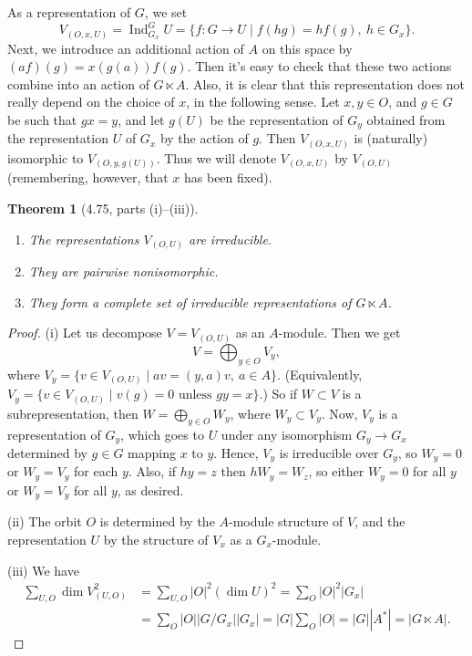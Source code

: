\documentclass[UTF8,11pt]{ctexart}
\newtheorem*{theorem}{Theorem}
\theoremstyle{definition}
\begin{document}
As a representation of $G$, we set
\[
V_{(O,x,U)}=\operatorname{Ind}_{G_x}^G U
=\{f:G\to U\mid f(hg)=hf(g),\ h\in G_x\}.
\]
Next, we introduce an additional action of $A$ on this space by $(af)(g)=x(g(a))f(g)$. Then it's easy to check that these two actions combine into an action of $G\ltimes A$. Also, it is clear that this representation does not really depend on the choice of $x$, in the following sense. Let $x,y\in O$, and $g\in G$ be such that $gx=y$, and let $g(U)$ be the representation of $G_y$ obtained from the representation $U$ of $G_x$ by the action of $g$. Then $V_{(O,x,U)}$ is (naturally) isomorphic to $V_{(O,y,g(U))}$. Thus we will denote $V_{(O,x,U)}$ by $V_{(O,U)}$ (remembering, however, that $x$ has been fixed).
\begin{theorem}[4.75, parts (i)--(iii)]
\begin{enumerate}[label=(\roman*)]
\item The representations $V_{(O,U)}$ are irreducible.
\item They are pairwise nonisomorphic.
\item They form a complete set of irreducible representations of $G\ltimes A$.
\end{enumerate}
\end{theorem}
\begin{proof}
(i) Let us decompose $V=V_{(O,U)}$ as an $A$-module. Then we get
\[
V=\bigoplus_{y\in O}V_y,
\]
where $V_y=\{v\in V_{(O,U)}\mid av=(y,a)v,\ a\in A\}$. (Equivalently, $V_y=\{v\in V_{(O,U)}\mid v(g)=0\text{ unless }gy=x\}$.) So if $W\subset V$ is a subrepresentation, then $W=\bigoplus_{y\in O}W_y$, where $W_y\subset V_y$. Now, $V_y$ is a representation of $G_y$, which goes to $U$ under any isomorphism $G_y\to G_x$ determined by $g\in G$ mapping $x$ to $y$. Hence, $V_y$ is irreducible over $G_y$, so $W_y=0$ or $W_y=V_y$ for each $y$. Also, if $hy=z$ then $hW_y=W_z$, so either $W_y=0$ for all $y$ or $W_y=V_y$ for all $y$, as desired.

(ii) The orbit $O$ is determined by the $A$-module structure of $V$, and the representation $U$ by the structure of $V_x$ as a $G_x$-module.

(iii) We have
\[
\begin{aligned}
\sum_{U,O}\dim V_{(U,O)}^2
&=\sum_{U,O}|O|^2(\dim U)^2
 =\sum_O|O|^2|G_x|\\
&=\sum_O|O||G/G_x||G_x|
 =|G|\sum_O|O|=|G||A^*|=|G\ltimes A|.
\end{aligned}
\]
\end{proof}
\end{document}
